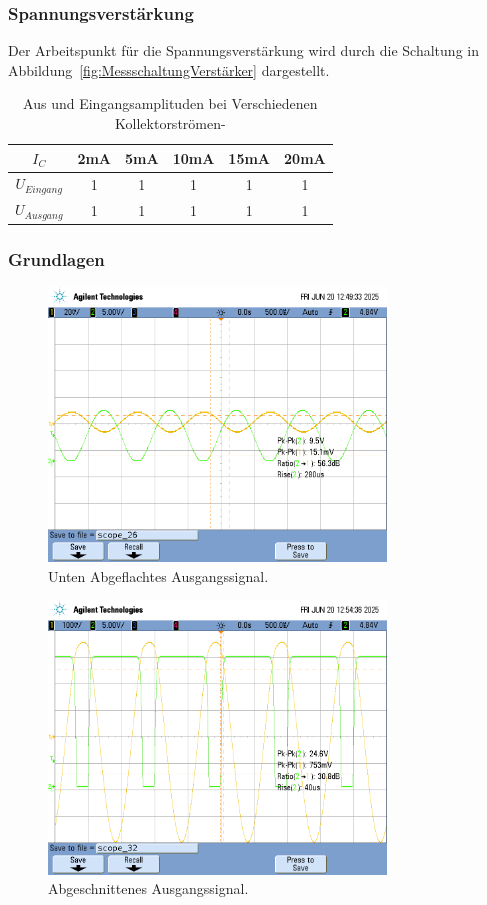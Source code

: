 \documentclass[
	a4paper, %
	12pt, %
]{CSUniSchoolLabReport}
\begin{document}
\subsubsection{Spannungsverstärkung}
Der Arbeitspunkt für die Spannungsverstärkung wird durch die Schaltung in Abbildung~\ref{fig:MessschaltungVerstärker} dargestellt.
\begin{table}[H]
\centering
\begin{tabular}{c|c|c|c|c|c}
$I_{C}$      & 2mA & 5mA & 10mA & 15mA & 20mA \\ \hline
$U_{Eingang}$ & 1   & 1   & 1    & 1    & 1    \\ \hline
$U_{Ausgang}$ & 1   & 1   & 1    & 1    & 1   
\end{tabular}
\caption{Aus und Eingangsamplituden bei Verschiedenen Kollektorströmen- }
\label{tab:my-table}
\end{table}
\subsubsection{Grundlagen}

\begin{figure}[H]
	\centering
	\includegraphics[width=0.8\textwidth]{Figures/scope_26.png}
	\caption{Unten Abgeflachtes Ausgangssignal.}
	\label{fig:supplyrailsmid}
\end{figure}
\begin{figure}[H]
	\centering
	\includegraphics[width=0.8\textwidth]{Figures/supplyrailskrass.png}
	\caption{Abgeschnittenes Ausgangssignal.}
	\label{fig:supplyrailskrass}
\end{figure}
\end{document}
